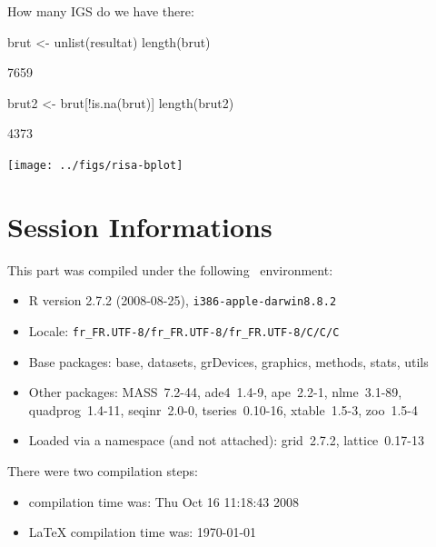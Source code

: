 \documentclass{article}
\begin{document}
How many IGS do we have there:

\begin{Schunk}
\begin{Sinput}
 brut <- unlist(resultat)
 length(brut)
\end{Sinput}
\begin{Soutput}
[1] 7659
\end{Soutput}
\begin{Sinput}
 brut2 <- brut[!is.na(brut)]
 length(brut2)
\end{Sinput}
\begin{Soutput}
[1] 4373
\end{Soutput}
\end{Schunk}

\begin{Schunk}
\end{Schunk}
\texttt{[image: ../figs/risa-bplot]}


\section*{Session Informations}

This part was compiled under the following \Rlogo{}~environment:

\begin{itemize}
  \item R version 2.7.2 (2008-08-25), \verb|i386-apple-darwin8.8.2|
  \item Locale: \verb|fr_FR.UTF-8/fr_FR.UTF-8/fr_FR.UTF-8/C/C/C|
  \item Base packages: base, datasets, grDevices, graphics, methods,
    stats, utils
  \item Other packages: MASS~7.2-44, ade4~1.4-9, ape~2.2-1,
    nlme~3.1-89, quadprog~1.4-11, seqinr~2.0-0, tseries~0.10-16,
    xtable~1.5-3, zoo~1.5-4
  \item Loaded via a namespace (and not attached): grid~2.7.2,
    lattice~0.17-13
\end{itemize}
There were two compilation steps:

\begin{itemize}
  \item \Rlogo{} compilation time was: Thu Oct 16 11:18:43 2008
  \item \LaTeX{} compilation time was: \today
\end{itemize}


\clearpage
{}


\end{document}
